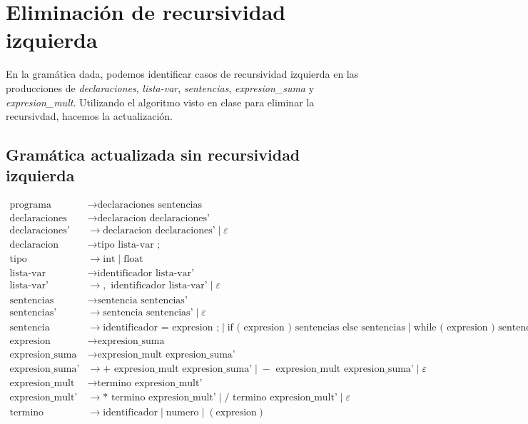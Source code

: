 \documentclass{article}
\begin{document}
\section*{Eliminación de recursividad izquierda}

En la gramática dada, podemos identificar casos de recursividad izquierda en las producciones de \textit{declaraciones}, \textit{lista-var}, \textit{sentencias}, \textit{expresion\_suma} y \textit{expresion\_mult}. Utilizando el algoritmo visto en clase para eliminar la recursivdad, hacemos la actualización.

\subsection*{Gramática actualizada sin recursividad izquierda}

\[
\begin{aligned}
\text{programa} &\to \text{declaraciones sentencias} \\
\text{declaraciones} &\to \text{declaracion declaraciones'} \\
\text{declaraciones'} &\to \text{declaracion declaraciones'} \;|\; \varepsilon \\
\text{declaracion} &\to \text{tipo lista-var ;} \\
\text{tipo} &\to \text{int} \;|\; \text{float} \\
\text{lista-var} &\to \text{identificador lista-var'} \\
\text{lista-var'} &\to , \text{ identificador lista-var'} \;|\; \varepsilon \\
\text{sentencias} &\to \text{sentencia sentencias'} \\
\text{sentencias'} &\to \text{sentencia sentencias'} \;|\; \varepsilon \\
\text{sentencia} &\to \text{identificador = expresion ;} \;|\; \text{if ( expresion ) sentencias else sentencias} \;|\; \text{while ( expresion ) sentencias} \\
\text{expresion} &\to \text{expresion\_suma} \\
\text{expresion\_suma} &\to \text{expresion\_mult expresion\_suma'} \\
\text{expresion\_suma'} &\to + \text{ expresion\_mult expresion\_suma'} \;|\; - \text{ expresion\_mult expresion\_suma'} \;|\; \varepsilon \\
\text{expresion\_mult} &\to \text{termino expresion\_mult'} \\
\text{expresion\_mult'} &\to * \text{ termino expresion\_mult'} \;|\; / \text{ termino expresion\_mult'} \;|\; \varepsilon \\
\text{termino} &\to \text{identificador} \;|\; \text{numero} \;|\; ( \text{expresion} )
\end{aligned}
\]
\end{document}
